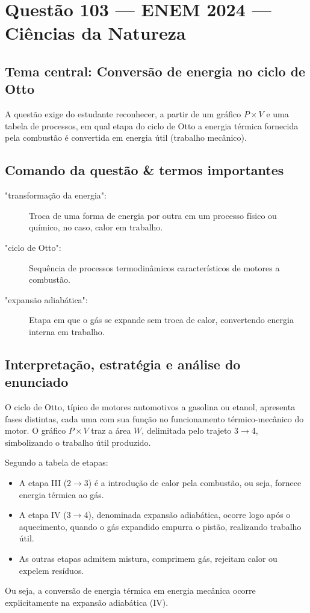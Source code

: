\documentclass{article}
\begin{document}
\section*{Questão 103 — ENEM 2024 — Ciências da Natureza}

\subsection*{Tema central: Conversão de energia no ciclo de Otto}
A questão exige do estudante reconhecer, a partir de um gráfico $P\times V$ e uma tabela de processos, em qual etapa do ciclo de Otto a energia térmica fornecida pela combustão é convertida em energia útil (trabalho mecânico).

\subsection*{Comando da questão & termos importantes}
\begin{description}
    \item["transformação da energia":] Troca de uma forma de energia por outra em um processo físico ou químico, no caso, calor em trabalho.
    \item["ciclo de Otto":] Sequência de processos termodinâmicos característicos de motores a combustão.
    \item["expansão adiabática":] Etapa em que o gás se expande sem troca de calor, convertendo energia interna em trabalho.
\end{description}

\subsection*{Interpretação, estratégia e análise do enunciado}

O ciclo de Otto, típico de motores automotivos a gasolina ou etanol, apresenta fases distintas, cada uma com sua função no funcionamento térmico-mecânico do motor. O gráfico $P\times V$ traz a área $W$, delimitada pelo trajeto 3$\rightarrow$4, simbolizando o trabalho útil produzido.

Segundo a tabela de etapas:
\begin{itemize}
    \item A etapa III (2$\rightarrow$3) é a introdução de calor pela combustão, ou seja, fornece energia térmica ao gás.
    \item A etapa IV (3$\rightarrow$4), denominada expansão adiabática, ocorre logo após o aquecimento, quando o gás expandido empurra o pistão, realizando trabalho útil.
    \item As outras etapas admitem mistura, comprimem gás, rejeitam calor ou expelem resíduos.
\end{itemize}
Ou seja, a conversão de energia térmica em energia mecânica ocorre explicitamente na expansão adiabática (IV).
\end{document}
